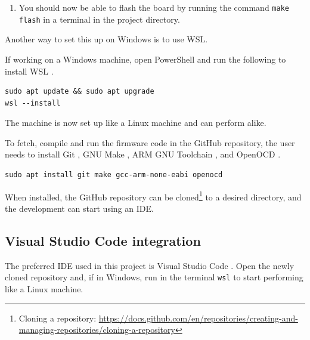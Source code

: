 \begin{appendices}
\begin{enumerate}
\begin{lstlisting}[style=bash]
        flash: all
       openocd -f interface/stlink.cfg -f target/@board version@.cfg -c "program $(BUILD_DIR)/$(TARGET).elf verify reset exit"
    \end{lstlisting}
    where the corresponding cfg file for your board, should be found in: \\ 
    \lstinline[style=bash]{<your path>\OpenOCD-<version>\share\openocd\scripts\target}
    \item You should now be able to flash the board by running the command \lstinline[style=bash]{make flash} in a terminal in the project directory.
 \end{enumerate}



Another way to set this up on Windows is to use \ac{WSL}.


If working on a Windows machine, open PowerShell and run the following to install \ac{WSL} .
\begin{lstlisting}[style=bash]
sudo apt update && sudo apt upgrade
wsl --install
\end{lstlisting}
The machine is now set up like a Linux machine and can perform alike.

To fetch, compile and run the firmware code in the GitHub repository, the user needs to install Git , GNU Make , ARM GNU Toolchain , and OpenOCD .
\begin{lstlisting}[style=bash]
sudo apt install git make gcc-arm-none-eabi openocd
\end{lstlisting}

When installed, the GitHub repository  can be cloned\footnote{Cloning a repository: \url{https://docs.github.com/en/repositories/creating-and-managing-repositories/cloning-a-repository}} to a desired directory, and the development can start using an \ac{IDE}.

\subsection{Visual Studio Code integration}
The preferred \ac{IDE} used in this project is Visual Studio Code . Open the newly cloned repository and, if in Windows, run in the terminal \lstinline[style=bash]{wsl} to start performing like a Linux machine.


\end{appendices}
